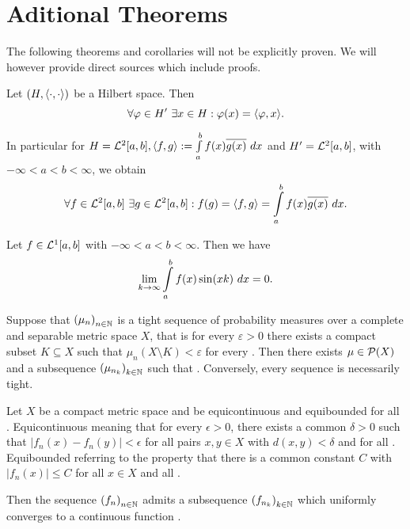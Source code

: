 \appendix
\chapter{Aditional Theorems}

The following theorems and corollaries will not be explicitly proven. We will however provide direct sources which include proofs.

\begin{theorem}\label{Rie-Fre}
	Let $(H, \inner{\cdot}{\cdot})$ be a Hilbert space. Then
	\[ \forall \varphi \in H'~\exists x \in H: \varphi(x) = \inner{\varphi}{x}. \]
\end{theorem}

\begin{corollary}
	In particular for $H = \ELL{2}[a, b], \inner{f}{g} := \int\limits_a^b f(x) \conj{g(x)}~dx$ and $H' = \ELL{2}[a,b]$, with $-\infty < a < b < \infty$, we obtain
	\[ \forall f \in \ELL{2}[a,b]~\exists g \in \ELL{2}[a,b]: f(g) = \inner{f}{g} = \int\limits_a^b f(x) \conj{g(x)}~dx. \]
\end{corollary}

\begin{theorem}\label{Rie-Leb}
	Let $f \in \ELL{1}[a,b]$ with $-\infty < a < b < \infty$. Then we have
	\[ \lim\limits_{\Ninf[k]} \int\limits_a^b f(x)\sin(xk)~dx = 0. \]
\end{theorem}

\begin{theorem}\label{Prok}
	Suppose that ${(\mu_n)}_{\NinN}$ is a tight sequence of probability measures over a complete and separable metric space $X$, that is for every $\varepsilon > 0$ there exists a compact subset $K \subseteq X$ such that $\mu_n(X \setminus K) < \varepsilon$ for every \NinN. Then there exists $\mu \in \PM{X}$ and a subsequence ${(\mu_{n_k})}_{\NinN[k]}$ such that . Conversely, every sequence  is necessarily tight.
\end{theorem}

\begin{theorem}\label{Arz-Asc}
	Let $X$ be a compact metric space and  be equicontinuous and equibounded for all \NinN. Equicontinuous meaning that for every $\epsilon > 0$, there exists a common $\delta > 0$ such that $|f_n(x) - f_n(y)| < \epsilon$ for all pairs $x, y \in X$ with $d(x, y) < \delta$ and for all \NinN. Equibounded referring to the property that there is a common constant $C$ with $|f_n(x)| \le C$ for all $x \in X$ and all \NinN.

	Then the sequence ${(f_n)}_{\NinN}$ admits a subsequence ${(f_{n_k})}_{\NinN[k]}$ which uniformly converges to a continuous function .
\end{theorem}

